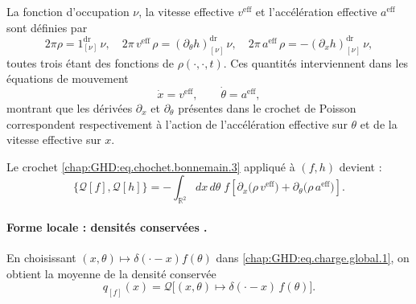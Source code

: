 La fonction d’occupation $\nu$, la vitesse effective $v^{\mathrm{eff}}$ et l’accélération effective $a^{\mathrm{eff}}$ sont définies par
\begin{equation}\label{chap:GHD:eq.nu.v.a.1}
	2 \pi \rho =  1^{\mathrm{dr}}_{[\nu]} \, \nu , 
	\quad 2 \pi \, v^{\mathrm{eff}} \, \rho  =(\partial_\theta h )^{\mathrm{dr}}_{[\nu]} \, \nu , 
	\quad 2 \pi \, a^{\mathrm{eff}} \, \rho  = -(\partial_x h )^{\mathrm{dr}}_{[\nu]}\, \nu ,
\end{equation}
toutes trois étant des fonctions de $\rho(\cdot,\cdot,t)$. Ces quantités interviennent dans les équations de mouvement
\begin{equation}
	\dot{x} = v^{\mathrm{eff}}, \qquad \dot{\theta} = a^{\mathrm{eff}},
\end{equation}
montrant que les dérivées $\partial_x$ et $\partial_\theta$ présentes dans le crochet de Poisson correspondent respectivement à l'action de l'accélération effective sur $\theta$ et de la vitesse effective sur $x$.

\medskip 

Le crochet \eqref{chap:GHD:eq.chochet.bonnemain.3} appliqué à $(f,h)$ devient :
\begin{equation}\label{chap:GHD:eq.chochet.bonnemain.4}
	\{\mathcal{Q}[f], \mathcal{Q}[h]\} 
	= - \int_{\mathbb{R}^2} dx\, d\theta \; f \left[ \partial_x \big( \rho \, v^{\mathrm{eff}} \big) 
	+ \partial_\theta \big( \rho \, a^{\mathrm{eff}} \big) \right].
\end{equation}

\paragraph{Forme locale : densités conservées .} 
En choisissant $(x,\theta) \mapsto \delta(\cdot - x)f(\theta)$ dans \eqref{chap:GHD:eq.charge.global.1}, on obtient la moyenne de la densité conservée \ie
\begin{equation}
	q_{[f]}(x) = \mathcal{Q} \big[ (x,\theta) \mapsto \delta(\cdot - x) \, f(\theta) \big].
\end{equation}

